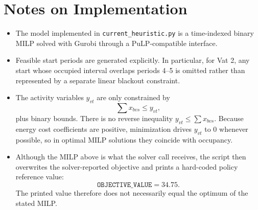 \section*{Notes on Implementation}

\begin{itemize}
    \item The model implemented in \texttt{current\_heuristic.py} is a time-indexed binary MILP solved with Gurobi through a PuLP-compatible interface.
    \item Feasible start periods are generated explicitly. In particular, for Vat 2, any start whose occupied interval overlaps periods 4--5 is omitted rather than represented by a separate linear blackout constraint.
    \item The activity variables $y_{vt}$ are only constrained by
    \[
    \sum x_{bvs} \le y_{vt},
    \]
    plus binary bounds. There is no reverse inequality $y_{vt}\le \sum x_{bvs}$. Because energy cost coefficients are positive, minimization drives $y_{vt}$ to 0 whenever possible, so in optimal MILP solutions they coincide with occupancy.
    \item Although the MILP above is what the solver call receives, the script then overwrites the solver-reported objective and prints a hard-coded policy reference value:
    \[
    \texttt{OBJECTIVE\_VALUE} = 34.75.
    \]
    The printed value therefore does not necessarily equal the optimum of the stated MILP.
\end{itemize}
